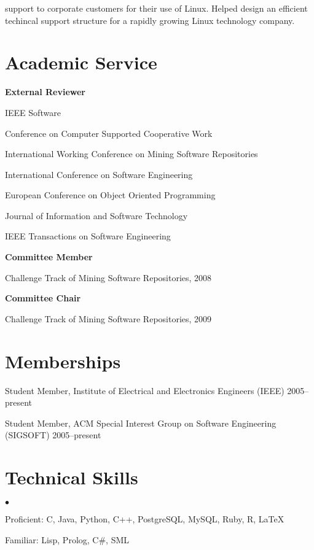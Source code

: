 \documentclass[margin,line,article]{res}
\newenvironment{noindentlist}{
  \begin{list}{}{%
      \setlength{\itemsep}{0in}
      \setlength{\parsep}{0in} \setlength{\parskip}{0in}
      \setlength{\topsep}{0in} \setlength{\partopsep}{0in} 
      \setlength{\leftmargin}{0in}}}{\end{list}}
\newenvironment{list1}{
  \begin{list}{}{%
      \setlength{\itemsep}{0in}
      \setlength{\parsep}{0in} \setlength{\parskip}{0in}
      \setlength{\topsep}{0in} \setlength{\partopsep}{0in} 
      \setlength{\leftmargin}{0.17in}}}{\end{list}}
\newenvironment{list2}{
  \begin{list}{$\bullet$}{%
      \setlength{\itemsep}{0in}
      \setlength{\parsep}{0in} \setlength{\parskip}{0in}
      \setlength{\topsep}{0in} \setlength{\partopsep}{0in} 
      \setlength{\leftmargin}{0.2in}}}{\end{list}}
\begin{document}
\begin{resume}
\begin{list1}
support to corporate customers for their use of Linux. Helped design an efficient 
techincal support structure for a rapidly growing Linux technology company.
\end{list1}


\section{Academic \hspace{.2in} Service}
\textbf{External Reviewer}
\begin{list1}
\item IEEE Software
\item Conference on Computer Supported Cooperative Work
\item International Working Conference on Mining Software Repositories
\item International Conference on Software Engineering
\item European Conference on Object Oriented Programming
\item Journal of Information and Software Technology
\item IEEE Transactions on Software Engineering
\end{list1}

\textbf{Committee Member}
\begin{list1}
\item Challenge Track of Mining Software Repositories, 2008
\end{list1}

\textbf{Committee Chair}
\begin{list1}
\item Challenge Track of Mining Software Repositories, 2009
\end{list1}

\section{Memberships}
\begin{noindentlist}
\item Student Member, Institute of Electrical and Electronics Engineers (IEEE) \hfill 2005--present
\item Student Member, ACM Special Interest Group on Software Engineering (SIGSOFT) \hfill 2005--present
\end{noindentlist}


\section{Technical Skills} 
\begin{list2}
\item Proficient:  C, Java, Python, C++, PostgreSQL, MySQL, Ruby, R, \LaTeX
\item Familiar: Lisp, Prolog, C\#, SML
\end{list2}


\end{resume}
\end{document}
